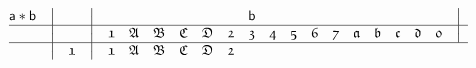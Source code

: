 \documentclass[final,12pt,a4paper,twoside,fleqn]{extbook}
\theoremstyle{definition}
\theoremstyle{remark}
\begin{document}
\begin{equation}
  \begin{array}{@{}*{22}c@{}}
      {\textsf{a}*\textsf{b}}&%
      \big\vert                    &%
      {}                           &%
      \big\vert                    &%
      {}                           &%
      {}                           &%
      {}                           &%
      {}                           &%
      {}                           &%
      {}                           &%
      {\textsf{b}}                 &%
      {}                           &%
      {}                           &%
      {}                           &%
      {}                           &%
      {}                           &%
      {}                           &%
      {}                           &%
      {}                           &%
      {}                           &%
      \big\vert                     %
      \\ \hline \nonumber
      {}                           &%
      \big\vert                    &%
      {}                           &%
      \big\vert                    &%
      {\mathfrak{1}}               &%
      {\mathfrak{A}}               &%
      {\mathfrak{B}}               &%
      {\mathfrak{C}}               &%
      {\mathfrak{D}}               &%
      {\mathfrak{2}}               &%
      {\mathfrak{3}}               &%
      {\mathfrak{4}}               &%
      {\mathfrak{5}}               &%
      {\mathfrak{6}}               &%
      {\mathfrak{7}}               &%
      {\mathfrak{a}}               &%
      {\mathfrak{b}}               &%
      {\mathfrak{c}}               &%
      {\mathfrak{d}}               &%
      {\mathfrak{0}}               &%
      \big\vert                     %
      \\ \hline \nonumber
      {}                           &%
      \big\vert                    &%
      {\mathfrak{1}}               &%
      \big\vert                    &%
      {\mathfrak{1}}               &%
      {\mathfrak{A}}               &%
      {\mathfrak{B}}               &%
      {\mathfrak{C}}               &%
      {\mathfrak{D}}               &%
      {\mathfrak{2}}               &%

\end{array}
\end{equation}
\end{document}
